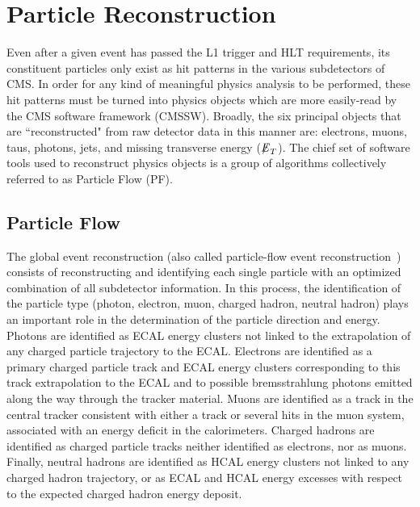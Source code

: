\section{Particle Reconstruction}

Even after a given event has passed the L1 trigger and HLT requirements, its constituent particles only exist as hit patterns in the various subdetectors of CMS. In order for any kind of meaningful physics analysis to be performed, these hit patterns must be turned into physics objects which are more easily-read by the CMS software framework (CMSSW). Broadly, the six principal objects that are ``reconstructed" from raw detector data in this manner are: electrons, muons, taus, photons, jets, and missing transverse energy (${\not\mathrel{E}}_T$). The chief set of software tools used to reconstruct physics objects is a group of algorithms collectively referred to as Particle Flow (PF).

\subsection{Particle Flow}

The global event reconstruction (also called particle-flow event reconstruction~\cite{CMS-PAS-PFT-09-001,CMS-PAS-PFT-10-001}) consists of reconstructing and identifying each single particle with an optimized combination of all subdetector information. In this process, the identification of the particle type (photon, electron, muon, charged hadron, neutral hadron) plays an important role in the determination of the particle direction and energy. Photons are identified as ECAL energy clusters not linked to the extrapolation of any charged particle trajectory to the ECAL. Electrons are identified as a primary charged particle track and ECAL energy clusters corresponding to this track extrapolation to the ECAL and to possible bremsstrahlung photons emitted along the way through the tracker material. Muons are identified as a track in the central tracker consistent with either a track or several hits in the muon system, associated with an energy deficit in the calorimeters. Charged hadrons are identified as charged particle tracks neither identified as electrons, nor as muons. Finally, neutral hadrons are identified as HCAL energy clusters not linked to any charged hadron trajectory, or as ECAL and HCAL energy excesses with respect to the expected charged hadron energy deposit.

